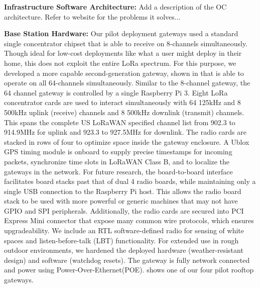 \vspace*{0.1cm}\noindent \textbf{Infrastructure Software Architecture: } {\color{blue} Add a description of the OC architecture. Refer to website for the problems it solves...}

\vspace*{0.1cm}\noindent \textbf{Base Station Hardware: } Our pilot deployment gateways used a standard single concentrator chipset that is able to receive on 8-channels simultaneously. Though ideal for low-cost deployments like what a user might deploy in their home, this does not exploit the entire LoRa spectrum.  For this purpose, we developed a more capable second-generation gateway, shown in  that is able to operate on all 64-channels simultaneously. 
Similar to the 8-channel gateway, the 64 channel gateway is controlled by a single Raspberry Pi 3. Eight LoRa concentrator cards are used to interact simultaneously with 64 125kHz and 8 500kHz uplink (receive) channels and 8 500kHz downlink (transmit) channels. This spans the complete US LoRaWAN specified channel list from 902.3 to 914.9MHz for uplink and 923.3 to 927.5MHz for downlink. The radio cards are stacked in rows of four to optimize space inside the gateway enclosure. A Ublox GPS timing module is onboard to supply precise timestamps for incoming packets, synchronize time slots in LoRaWAN Class B, and to localize the gateways in the network. For future research, the board-to-board interface facilitates board stacks past that of dual 4 radio boards, while maintaining only a single USB connection to the Raspberry Pi host. This allows the radio board stack to be used with more powerful or generic machines that may not have GPIO and SPI peripherals. Additionally, the radio cards are secured into PCI Express Mini connector that expose many common wire protocols, which ensures upgradeability. We include an RTL software-defined radio for sensing of white spaces and listen-before-talk (LBT) functionality. For extended use in rough outdoor environments, we hardened the deployed hardware (weather-resistant design) and software (watchdog resets). The gateway is fully network connected and power using Power-Over-Ethernet(POE).  shows one of our four pilot rooftop gateways.



